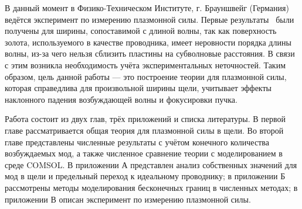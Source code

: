 В данный момент в Физико-Техническом Институте, г. Брауншвейг (Германия) ведётся эксперимент по измерению плазмонной силы. Первые результаты~\cite{nies2018direct} были получены для ширины, сопоставимой с длиной волны, так как поверхность золота, используемого в качестве проводника, имеет неровности порядка длины волны, из-за чего нельзя сблизить пластины на субволновые расстояния. В связи с этим возникла необходимость учёта экспериментальных неточностей.  Таким образом, цель данной работы --- это построение теории для плазмонной силы, которая справедлива для произвольной ширины щели, учитывает эффекты наклонного падения возбуждающей волны и фокусировки пучка. 

Работа состоит из двух глав, трёх приложений и списка литературы.
В первой главе рассматривается общая теория для плазмонной силы в щели. Во второй главе представлены численные результаты с учётом конечного количества возбуждаемых мод, а также численное сравнение теории с моделированием в среде COMSOL. В приложении А представлен анализ собственных значений для мод в щели и предельный переход к идеальному проводнику; в приложении Б рассмотрены методы моделирования бесконечных границ в численных методах; в приложении В описан эксперимент по измерению плазмонной силы. 


